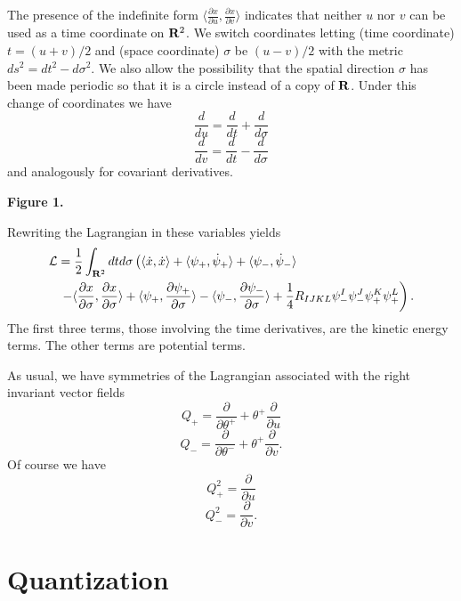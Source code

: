 The presence of the indefinite form  $\langle \frac{\partial
x}{\partial u},\frac{\partial x}{\partial v}\rangle$ indicates that
neither $u$ nor $v$ can be used as a time coordinate
on ${\bf R}^2$.
We
switch coordinates letting (time coordinate) $t=(u+v)/2$ and (space 
coordinate) $\sigma$ be $(u-v)/2$ with the metric $ds^2=dt^2-d\sigma^2$. 
We also allow the possibility that the spatial direction $\sigma$ has
been made periodic so that it is a circle instead of a copy of ${\bf
  R}$.
Under this change of coordinates we have
$$\frac{d}{du}=\frac{d}{dt}+\frac{d}{d\sigma}$$
$$\frac{d}{dv}=\frac{d}{dt}-\frac{d}{d\sigma}$$
and analogously for covariant derivatives.

\centerline{\quad}
\centerline{\epsfxsize=1in}
\centerline{\bf Figure 1.}
\centerline{\quad}

Rewriting the Lagrangian in these variables yields
\begin{eqnarray*}
\lefteqn{{\cal L}=\frac{1}{2}\int_{{\bf R}^2}dtd\sigma\left(\langle \dot x,\dot
x\rangle+\langle 
\psi_+,\dot \psi_+\rangle +\langle \psi_-,\dot\psi_-\rangle\right. }  \\
& &\left.-\langle\frac{\partial x}{\partial\sigma},\frac{\partial x}{\partial
\sigma}\rangle +\langle \psi_+,\frac{\partial \psi_+}{\partial
\sigma}\rangle -\langle\psi_-,\frac{\partial \psi_-}{\partial
\sigma}\rangle
+\frac{1}{4}R_{IJKL}\psi_-^I\psi_-^J\psi_+^K\psi_+^L\right).
\end{eqnarray*}
The first three terms, those  involving the time derivatives, are the
kinetic energy terms.  The other terms are potential terms.


As usual, we have symmetries of the Lagrangian associated with the right
invariant vector fields
$$Q_+=\frac{\partial}{\partial
  \theta^+}+\theta^+\frac{\partial}{\partial u}$$
$$Q_-=\frac{\partial}{\partial
  \theta^-}+\theta^+\frac{\partial}{\partial v}.$$
Of course we have
$$Q_+^2=\frac{\partial }{\partial u}$$
$$Q_-^2=\frac{\partial }{\partial v}.$$


\section{Quantization}

